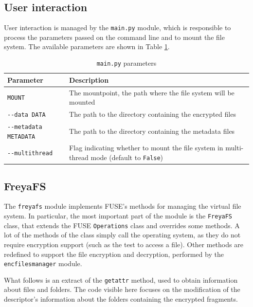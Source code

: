 \documentclass[a4paper,12pt,twoside,openright]{report}
\begin{document}
  \subsection{User interaction}

  User interaction is managed by the \texttt{main.py} module, which is responsible to process
  the parameters passed on the command line and to mount the file system.
  The available parameters are shown in Table \ref{table-main}.

  \begin{table}[h!]
    \centering
    \begin{tabular}{|p{4.5cm}|p{9.5cm}|} 
      \hline
      Parameter & Description \\ [0.5ex] 
      \hline\hline
      \texttt{MOUNT} & The mountpoint, the path where the file system will be mounted \\ 
      \hline
      \texttt{-{}-data DATA} & The path to the directory containing the encrypted files \\
      \hline
      \texttt{-{}-metadata METADATA} & The path to the directory containing the metadata files \\
      \hline
      \texttt{-{}-multithread} & Flag indicating whether to mount the file system in multi-thread mode (default to \texttt{False}) \\
      \hline
    \end{tabular}
    \caption{\texttt{main.py} parameters}
    \label{table-main}
  \end{table}
  
  
  \subsection{FreyaFS}

  The \texttt{freyafs} module implements FUSE's methods for managing the virtual file system.
  In particular, the most important part of the module is the \texttt{FreyaFS} class, that extends
  the FUSE \texttt{Operations} class and overrides some methods.
  A lot of the methods of the class simply call the operating system, as they do not require encryption support
  (such as the test to access a file).
  Other methods are redefined to support the file encryption and decryption, performed by the
  \texttt{encfilesmanager} module.
  
  What follows is an extract of the \texttt{getattr} method, used to obtain information about
  files and folders. The code visible here focuses on the modification of the descriptor's information
  about the folders containing the encrypted fragments.
\end{document}

